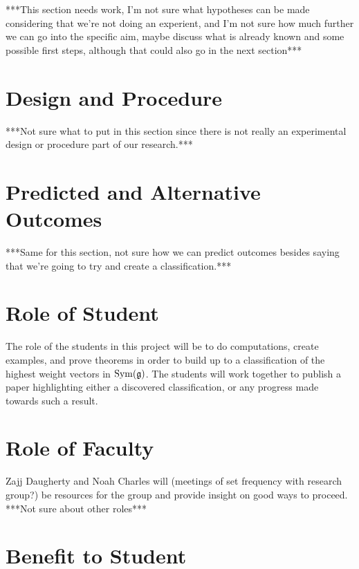 \documentclass[11pt, reqno]{amsart}
\begin{document}
***This section needs work, I'm not sure what hypotheses can be made considering that we're not doing an experient, and I'm not sure how much further we can go into the specific aim, maybe discuss what is already known and some possible first steps, although that could also go in the next section***

\section{Design and Procedure}

***Not sure what to put in this section since there is not really an experimental design or procedure part of our research.***

\section{Predicted and Alternative Outcomes}

***Same for this section, not sure how we can predict outcomes besides saying that we're going to try and create a classification.***

\section{Role of Student}

The role of the students in this project will be to do computations, create examples, and prove theorems in order to build up to a classification of the highest weight vectors in $\operatorname{Sym}(\mathfrak{g})$. The students will work together to publish a paper highlighting either a discovered classification, or any progress made towards such a result.

\section{Role of Faculty}

Zajj Daugherty and Noah Charles will (meetings of set frequency with research group?) be resources for the group and provide insight on good ways to proceed. ***Not sure about other roles***

\section{Benefit to Student}


\printbibliography{}
\end{document}
